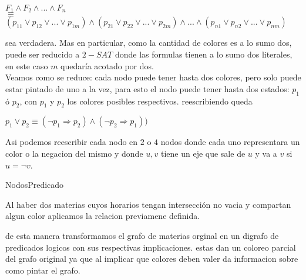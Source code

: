 {\centering
    $F_1 \land F_2 \land ... \land F_n$ \\
    $\equiv$ \\
    $(p_{11} \lor p_{12} \lor ... \lor p_{1m}) \land (p_{21} \lor p_{22} \lor ... \lor p_{2m}) \land ... \land (p_{n1} \lor p_{n2} \lor ... \lor p_{nm})$ \\ \par
}
\vspace{5mm}

sea verdadera. Mas en particular, como la cantidad de colores es a lo sumo dos, puede ser reducido a $2-SAT$ donde las formulas tienen a lo sumo dos literales, en este caso $m$ quedar\'ia acotado por dos.\\

Veamos como se reduce: cada nodo puede tener hasta dos colores, pero solo puede estar pintado de uno a la vez, para esto el nodo puede tener hasta dos estados: $p_1$ \'o $p_2$, con $p_1$ y $p_2$ los colores posibles respectivos. reescribiendo queda \\

{\centering
    $p_1 \lor p_2 \equiv (\neg p_1 \Rightarrow p_2) \land (\neg p_2 \Rightarrow p_1))$\\ \par
}
\vspace{5mm}

Asi podemos reescribir cada nodo en $2$ o $4$ nodos donde cada uno representara un color o la negacion del mismo y donde $u,v$ tiene un eje que sale de $u$ y va a $v$ si $u = \neg v$. 

\vspace{5mm}
    \begin{center}
        
        \caption{NodosPredicado}
    \end{center}
\vspace{5mm}

Al haber dos materias cuyos horarios tengan intersecci\'on no vacia y compartan algun color aplicamos la relacion previamene definida.

\vspace{5mm}
    \begin{center}
        
    \end{center}
\vspace{5mm}

de esta manera transformamos el grafo de materias orginal en un digrafo de predicados logicos con sus respectivas implicaciones. estas dan un coloreo parcial del grafo original ya que al implicar que colores deben valer da informacion sobre como pintar el grafo.\\


